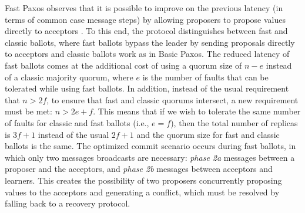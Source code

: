 Fast Paxos observes that it is possible to improve on the previous latency (in terms of common case message steps) by allowing proposers to propose values directly to acceptors \cite{L06}. To this end, the protocol distinguishes between fast and classic ballots, where fast ballots bypass the leader by sending proposals directly to acceptors and classic ballots work as in Basic Paxos. The reduced latency of fast ballots comes at the additional cost of using a quorum size of $n-e$ instead of a classic majority quorum, where $e$ is the number of faults that can be tolerated while using fast ballots. In addition, instead of the usual requirement that $n> 2f$, to ensure that fast and classic quorums intersect, a new requirement must be met: $n > 2e+f$. This means that if we wish to tolerate the same number of faults for classic and fast ballots (i.e., $e=f$), then the total number of replicas is $3f+1$ instead of the usual $2f+1$ and the quorum size for fast and classic ballots is the same. The optimized commit scenario occurs during fast ballots, in which only two messages broadcasts are necessary: \textit{phase 2a} messages between a proposer and the acceptors, and \textit{phase 2b} messages between acceptors and learners. This creates the possibility of two proposers concurrently proposing values to the acceptors and generating a conflict, which must be resolved by falling back to a recovery protocol. \par

